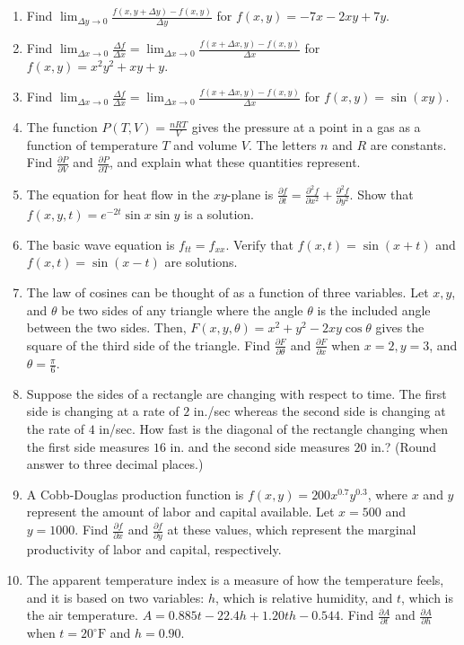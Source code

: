 \documentclass{exercises}
\begin{document}
\begin{enumerate}[resume]
\item Find $\lim_{\Delta y\to0}\frac{f(x,y+\Delta y)-f(x,y)}{\Delta y}$ for $f(x,y)=-7x-2xy+7y$.
\item Find $\lim_{\Delta x\to0}\frac{\Delta f}{\Delta x}=\lim_{\Delta x\to0}\frac{f(x+\Delta x,y)-f(x,y)}{\Delta x}$ for $f(x,y)=x^{2}y^{2}+xy+y$.
\item Find $\lim_{\Delta x\to0}\frac{\Delta f}{\Delta x}=\lim_{\Delta x\to0}\frac{f(x+\Delta x,y)-f(x,y)}{\Delta x}$ for $f(x,y)=\sin(xy)$.
\item The function $P(T,V)=\frac{nRT}{V}$ gives the pressure at a point in a gas as a function of temperature $T$ and volume $V$. The letters $n$ and $R$ are constants. Find $\frac{\partial P}{\partial V}$ and $\frac{\partial P}{\partial T}$, and explain what these quantities represent.
\item The equation for heat flow in the $xy$-plane is $\frac{\partial f}{\partial t}=\frac{\partial^{2}f}{\partial x^{2}}+\frac{\partial^{2}f}{\partial y^{2}}$. Show that $f(x,y,t)=e^{-2t}\sin x\sin y$ is a solution.
\item The basic wave equation is $f_{tt}=f_{xx}$. Verify that $f(x,t)=\sin(x+t)$ and $f(x,t)=\sin(x-t)$ are solutions.
\item The law of cosines can be thought of as a function of three variables. Let $x,y$, and $\theta$ be two sides of any triangle where the angle $\theta$ is the included angle between the two sides. Then, $F(x,y,\theta)=x^{2}+y^{2}-2xy\cos \theta$ gives the square of the third side of the triangle. Find $\frac{\partial F}{\partial \theta}$ and $\frac{\partial F}{\partial x}$ when $x=2,y=3$, and $\theta=\frac{\pi}{6}$.
\item Suppose the sides of a rectangle are changing with respect to time. The first side is changing at a rate of $2$ in./sec whereas the second side is changing at the rate of $4$ in/sec. How fast is the diagonal of the rectangle changing when the first side measures $16$ in. and the second side measures $20$ in.? (Round answer to three decimal places.)
\item A Cobb-Douglas production function is $f(x,y)=200x^{0.7}y^{0.3}$, where $x$ and $y$ represent the amount of labor and capital available. Let $x=500$ and $y=1000$. Find $\frac{\partial f}{\partial x}$ and $\frac{\partial f}{\partial y}$ at these values, which represent the marginal productivity of labor and capital, respectively.
\item The apparent temperature index is a measure of how the temperature feels, and it is based on two variables: $h$, which is relative humidity, and $t$, which is the air temperature. $A=0.885t-22.4h+1.20th-0.544$. Find $\frac{\partial A}{\partial t}$ and $\frac{\partial A}{\partial h}$ when $t=20^\circ \text{F}$ and $h=0.90$.
\end{enumerate}
\end{document}
